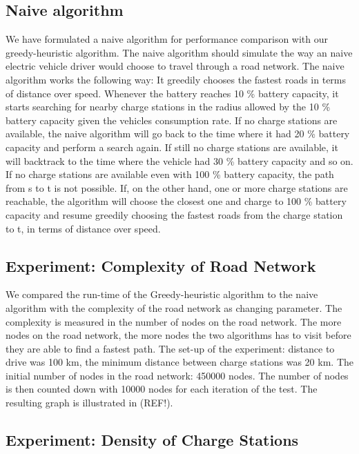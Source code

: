 \subsection{Naive algorithm}
\label{sub:naivealgorithm}
We have formulated a naive algorithm for performance comparison with our greedy-heuristic algorithm. The naive algorithm should simulate the way an naive electric vehicle driver would choose to travel through a road network. The naive algorithm works the following way: It greedily chooses the fastest roads in terms of distance over speed. Whenever the battery reaches 10 \% battery capacity, it starts searching for nearby charge stations in the radius allowed by the 10 \% battery capacity given the vehicles consumption rate. If no charge stations are available, the naive algorithm will go back to the time where it had 20 \% battery capacity and perform a search again. If still no charge stations are available, it will backtrack to the time where the vehicle had 30 \% battery capacity and so on. If no charge stations are available even with 100 \% battery capacity, the path from s to t is not possible. If, on the other hand, one or more charge stations are reachable, the algorithm will choose the closest one and charge to 100 \% battery capacity and resume greedily choosing the fastest roads from the charge station to t, in terms of distance over speed.



\subsection{Experiment: Complexity of Road Network}

We compared the run-time of the Greedy-heuristic algorithm to the naive algorithm with the complexity of the road network as changing parameter. The
complexity is measured in the number of nodes on the road network. The more nodes on the road network, the more nodes the two algorithms has 
to visit before they are able to find a fastest path. The set-up of the experiment: distance to drive was 100 km, the minimum distance between 
charge stations was 20 km. The initial number of nodes in the road network: 450000 nodes. The number of nodes is then counted down with 10000 nodes 
for each iteration of the test. The resulting graph is illustrated in (REF!).

\subsection{Experiment: Density of Charge Stations}

